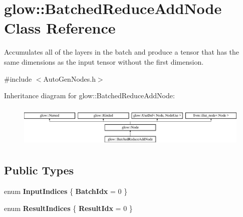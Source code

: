\hypertarget{classglow_1_1_batched_reduce_add_node}{}\section{glow\+:\+:Batched\+Reduce\+Add\+Node Class Reference}
\label{classglow_1_1_batched_reduce_add_node}


Accumulates all of the layers in the batch and produce a tensor that has the same dimensions as the input tensor without the first dimension.  




{\ttfamily \#include $<$Auto\+Gen\+Nodes.\+h$>$}

Inheritance diagram for glow\+:\+:Batched\+Reduce\+Add\+Node\+:\begin{figure}[H]
\begin{center}
\leavevmode
\includegraphics[height=2.028986cm]{classglow_1_1_batched_reduce_add_node}
\end{center}
\end{figure}
\subsection*{Public Types}
\begin{DoxyCompactItemize}
\item 
\mbox{\label{classglow_1_1_batched_reduce_add_node_a8d36ae2fc92c29e2b6436e7740807b1b}} 
enum {\bfseries Input\+Indices} \{ {\bfseries Batch\+Idx} = 0
 \}
\item 
\mbox{\label{classglow_1_1_batched_reduce_add_node_ac45881f60e4c08b28dbf269c869ca502}} 
enum {\bfseries Result\+Indices} \{ {\bfseries Result\+Idx} = 0
 \}
\end{DoxyCompactItemize}
